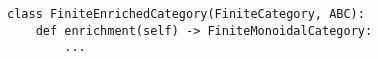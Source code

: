 \begin{verbatim}
class FiniteEnrichedCategory(FiniteCategory, ABC):
    def enrichment(self) -> FiniteMonoidalCategory:
        ...
\end{verbatim}